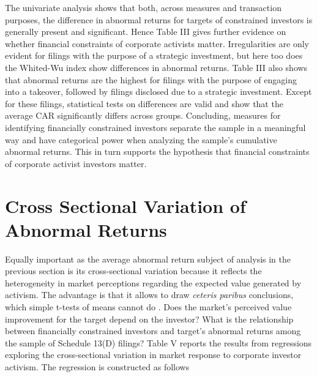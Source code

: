 \documentclass[12pt]{article}
\begin{document}
The univariate analysis shows that both, across measures and transaction purposes, the difference in abnormal returns for targets of constrained investors is generally present and significant. Hence Table III gives further evidence on whether financial constraints of corporate activists matter. Irregularities are only evident for filings with the purpose of a strategic investment, but here too does the Whited-Wu index show differences in abnormal returns. 
Table III also shows that abnormal returns are the highest for filings with the purpose of engaging into a takeover, followed by filings disclosed due to a strategic investment. Except for these filings, statistical tests on differences are valid and show that the average CAR significantly differs across groups. Concluding, measures for identifying financially constrained investors separate the sample in a meaningful way and have categorical power when analyzing the sample's cumulative abnormal returns. This in turn supports the hypothesis that financial constraints of corporate activist investors matter. 


\section{Cross Sectional Variation of Abnormal Returns}

Equally important as the average abnormal return subject of analysis in the previous section is its cross-sectional variation because it reflects the heterogeneity in market perceptions regarding the expected value generated by activism. The advantage is that it allows to draw \emph{ceteris paribus} conclusions, which simple t-tests of means cannot do \citep[p.111]{Khatami2014}. Does the market's perceived value improvement for the target depend on the investor? What is the relationship between financially constrained investors and target's abnormal returns among the sample of Schedule 13(D) filings? Table V reports the results from regressions exploring the cross-sectional variation in market response to corporate investor activism. The regression is constructed as follows 
\end{document}
